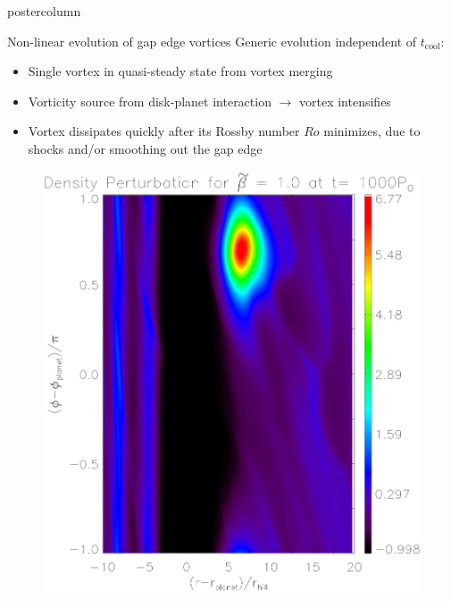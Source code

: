 \documentclass[final,hyperref={pdfpagelabels=false}]{beamer}
\begin{document}
\begin{frame}
\begin{columns}
\begin{column}{.49\textwidth}
\begin{beamercolorbox}[center,wd=\textwidth]{postercolumn}
\begin{minipage}[T]{.95\textwidth}
{            \begin{block}{\Large{Non-linear evolution of gap edge
                  vortices}}
              \justifying
              Generic evolution independent of $t_\mathrm{cool}$:
              \begin{itemize}
              \item Single vortex in quasi-steady state from vortex merging
              \item Vorticity source from disk-planet interaction
                $\to$ vortex intensifies
              \item Vortex dissipates quickly after its Rossby number
                $Ro$ minimizes, due to shocks and/or smoothing out the
                gap edge  
              \end{itemize}
                  \begin{figure}
                    \centering
                    \hfill
                    \begin{minipage}{0.3\textwidth}
                      \includegraphics[width=\textwidth]{Posterfig_Before}

\end{minipage}
\end{figure}
\end{block}}
\end{minipage}
\end{beamercolorbox}
\end{column}
\end{columns}
\end{frame}
\end{document}
